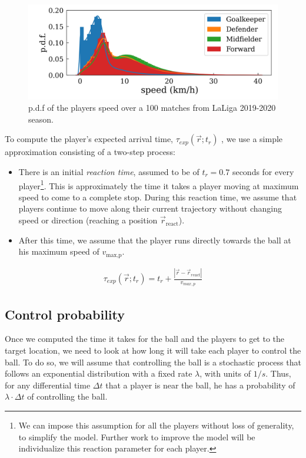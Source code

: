 \documentclass[
  twoside,nohyper]{book}
\providecommand{\tightlist}{%
  \setlength{\itemsep}{0pt}\setlength{\parskip}{0pt}}
\begin{document}
\begin{figure}[H]

{\centering \includegraphics[width=0.8\linewidth,]{imagenes/vel} 

}

\caption{p.d.f of the players speed over a 100 matches from LaLiga 2019-2020 season.}\label{fig:vel}
\end{figure}

To compute the player's expected arrival time, \(\tau_{exp}(\vec{r};t_r)\) , we use a simple approximation consisting of a two-step process:

\begin{itemize}
\tightlist
\item
  There is an initial \emph{reaction time}, assumed to be of \(t_{r} = 0.7\) seconds for every player\footnote{We can impose this assumption for all the players without loss of generality, to simplify the model. Further work to improve the model will be individualize this reaction parameter for each player.}. This is approximately the time it takes a player moving at maximum speed to come to a complete stop. During this reaction time, we assume that players continue to move along their current trajectory without changing speed or direction (reaching a position \(\vec{r}_{\text{react}}\)).
\item
  After this time, we assume that the player runs directly towards the ball at his maximum speed of \(v_{\text{max,p}}\).
\end{itemize}

\begin{align}
    \tau_{exp}(\vec{r} ; t_r) = t_r + \frac{|\vec{r} - \vec{r}_{react}|}{v_{max,p}}
    \label{exp_arr_time}
\end{align}

\subsection{Control probability}\label{control-probability}

Once we computed the time it takes for the ball and the players to get to the target location, we need to look at how long it will take each player to control the ball. To do so, we will assume that controlling the ball is a stochastic process that follows an exponential distribution with a fixed rate \(\lambda\), with units of \(1/s\). Thus, for any differential time \(\Delta t\) that a player is near the ball, he has a probability of \(\lambda \cdot \Delta t\) of controlling the ball.
\end{document}
